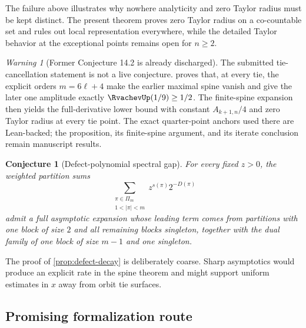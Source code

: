 \documentclass[11pt,oneside]{article}
\newtheorem{conjecture}[theorem]{Conjecture}
\theoremstyle{definition}
\theoremstyle{remark}
\newtheorem{warning}[theorem]{Warning}
\begin{document}
The failure above illustrates why nowhere analyticity and zero Taylor radius must be
kept distinct.  The present theorem proves zero Taylor radius on a co-countable set
and rules out local representation everywhere, while the detailed Taylor behavior at
the exceptional points remains open for $n\geq2$.

\begin{warning}[Former Conjecture 14.2 is already discharged]
\label{warn:ties}
The submitted tie-cancellation statement is not a live conjecture.
 proves that, at every tie, the explicit orders
$m=6\ell+4$ make the earlier maximal spine vanish and give the later one amplitude
exactly $\RvachevUp(1/9)\geq1/2$.  The finite-spine expansion then yields the full-derivative
lower bound with constant $A_{k+1,n}/4$ and zero Taylor radius at every tie point.
The exact quarter-point anchors used there are Lean-backed; the proposition, its
finite-spine argument, and its iterate conclusion remain manuscript results.
\end{warning}

\begin{conjecture}[Defect-polynomial spectral gap]
\label{conj:defect-polynomial}
For every fixed $z>0$, the weighted partition sums
\[
 \sum_{\substack{\pi\in\Pi_m\\1<|\pi|<m}}z^{s(\pi)}2^{-D(\pi)}
\]
admit a full asymptotic expansion whose leading term comes from partitions with one
block of size $2$ and all remaining blocks singleton, together with the dual family
of one block of size $m-1$ and one singleton.
\end{conjecture}

The proof of \cref{prop:defect-decay} is deliberately coarse.  Sharp asymptotics would
produce an explicit rate in the spine theorem and might support uniform estimates in
$x$ away from orbit tie surfaces.

\subsection{Promising formalization route}
\end{document}
